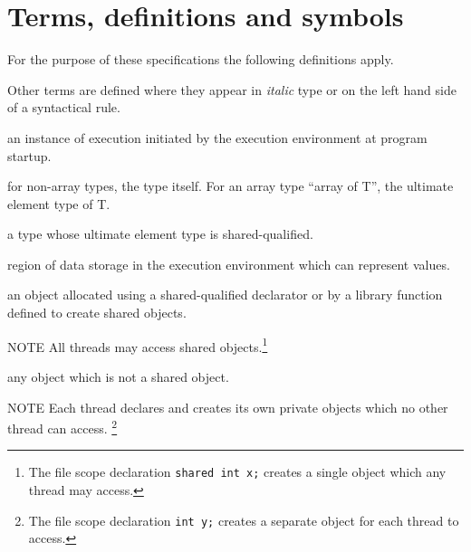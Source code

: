 

\section{Terms, definitions and symbols}

\npf For the purpose of these specifications the following
    definitions apply.

\np Other terms are defined where they appear in {\em
    italic} type or on the left hand side of a syntactical rule.

% 
     an instance of execution initiated by the execution
     environment at program startup.

%
     for non-array types, the type itself.  For an array type ``array of T'',
     the ultimate element type of T.


%
     a type whose ultimate element type is shared-qualified.


%
     region of data storage in the execution environment
     which can represent values.

%
    an object allocated using a shared-qualified
    declarator or by a library function defined to create shared objects.
    
\np  NOTE \hspace{5pt}  All threads may access shared 
     objects.\footnote{The file scope declaration
     {\tt shared int x;} creates a single object which any thread may access.}
   
%
     any object which is not a shared object.

\np  NOTE \hspace{5pt} Each thread declares and creates its own 
     private objects which no other thread can access.
     \footnote{The file scope declaration
     {\tt int y;} creates a separate object for each thread to access.}

